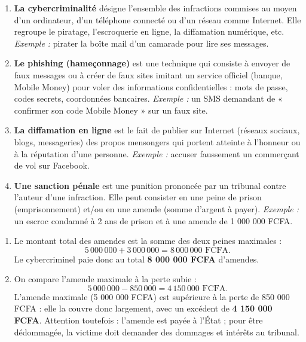 \documentclass[11pt]{article}
\begin{document}
\begin{corrige}
\begin{enumerate}
\item \textbf{La cybercriminalité} désigne l'ensemble des infractions commises au moyen d'un ordinateur, d'un téléphone connecté ou d'un réseau comme Internet. Elle regroupe le piratage, l'escroquerie en ligne, la diffamation numérique, etc. \emph{Exemple :} pirater la boîte mail d'un camarade pour lire ses messages.
\item \textbf{Le phishing (hameçonnage)} est une technique qui consiste à envoyer de faux messages ou à créer de faux sites imitant un service officiel (banque, Mobile Money) pour voler des informations confidentielles : mots de passe, codes secrets, coordonnées bancaires. \emph{Exemple :} un SMS demandant de « confirmer son code Mobile Money » sur un faux site.
\item \textbf{La diffamation en ligne} est le fait de publier sur Internet (réseaux sociaux, blogs, messageries) des propos mensongers qui portent atteinte à l'honneur ou à la réputation d'une personne. \emph{Exemple :} accuser faussement un commerçant de vol sur Facebook.
\item \textbf{Une sanction pénale} est une punition prononcée par un tribunal contre l'auteur d'une infraction. Elle peut consister en une peine de prison (emprisonnement) et/ou en une amende (somme d'argent à payer). \emph{Exemple :} un escroc condamné à 2 ans de prison et à une amende de 1 000 000 FCFA.
\end{enumerate}
\end{corrige}

\begin{corrige}
\begin{enumerate}
\item Le montant total des amendes est la somme des deux peines maximales :
\[ 5\,000\,000 + 3\,000\,000 = 8\,000\,000 \text{ FCFA}. \]
Le cybercriminel paie donc au total \textbf{8 000 000 FCFA} d'amendes.
\item On compare l'amende maximale à la perte subie :
\[ 5\,000\,000 - 850\,000 = 4\,150\,000 \text{ FCFA}. \]
L'amende maximale (5 000 000 FCFA) est supérieure à la perte de 850 000 FCFA : elle la couvre donc largement, avec un excédent de \textbf{4 150 000 FCFA}. Attention toutefois : l'amende est payée à l'État ; pour être dédommagée, la victime doit demander des dommages et intérêts au tribunal.
\end{enumerate}
\end{corrige}
\end{document}
